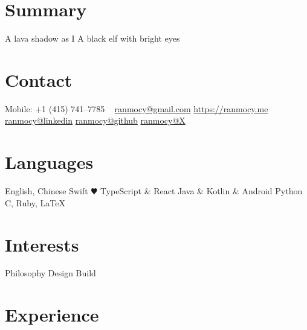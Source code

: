 \documentclass[]{friggeri-cv}
\begin{document}


\begin{aside} %
  \section{Summary}
  A lava shadow as I
  A black elf
  with bright eyes
  \section{Contact}
  Mobile:
  +1 (415) 741--7785
  ~
  \href{mailto:ranmocy+cv@gmail.com}{ranmocy@gmail.com}
  \href{https://ranmocy.me}{https://ranmocy.me}
  \href{https://www.linkedin.com/in/ranmocy}{ranmocy@linkedin}
  \href{https://github.com/ranmocy}{ranmocy@github}
  \href{https://twitter.com/ranmocy}{ranmocy@X}
  \section{Languages}
  English, Chinese
  Swift {\color{red} $\varheartsuit$}
  TypeScript \& React
  Java \& Kotlin \& Android
  Python
  C, Ruby, LaTeX
  \section{Interests}
  Philosophy
  Design
  Build
\end{aside}


\section{Experience}
\end{document}
